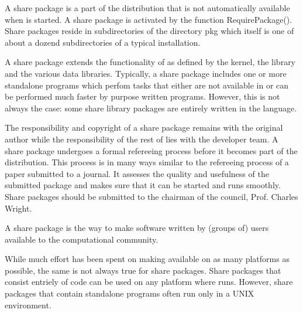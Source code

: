 


A {\GAP} share package is  a part of  the {\GAP} distribution that is not
automatically   available when  {\GAP}  is  started.  A  share package is
activated by the  function  RequirePackage().  Share packages  reside  in
subdirectories of the directory pkg which itself is one of about a dozend
subdirectories of a typical {\GAP} installation.

A share package extends  the functionality of   {\GAP} as defined by  the
{\GAP} kernel,  the   {\GAP}  library  and  the  various  data libraries.
Typically, a share package includes one or more standalone programs which
perfom tasks that either are not available in  {\GAP} or can be performed
much faster by purpose written programs.  However, this is not always the
case:  some share library packages   are entirely  written in the  {\GAP}
language.

The responsibility  and copyright of  a share  package remains  with  the
original author while the responsibility of  the rest of {\GAP} lies with
the {\GAP} developer team.  A share package undergoes a formal refereeing
process before it becomes part  of the {\GAP} distribution.  This process
is in many ways similar to the refereeing process of a paper submitted to
a  journal.    It assesses the quality  and   usefulness of the submitted
package and makes sure  that it can be  started and runs smoothly.  Share
packages  should  be submitted to  the  chairman of   the {\GAP} council,
Prof. Charles Wright.

A share package is the way to make software written by (groups of) {\GAP}
users available to the computational community.

While much effort has  been spent on making {\GAP}  available on  as many
platforms as  possible, the same is  not always  true for share packages.
Share packages that consist entriely  of {\GAP} code  can be used on  any
platform where  {\GAP}  runs.   However,   share  packages that   contain
standalone programs often run only in a UNIX environment.


